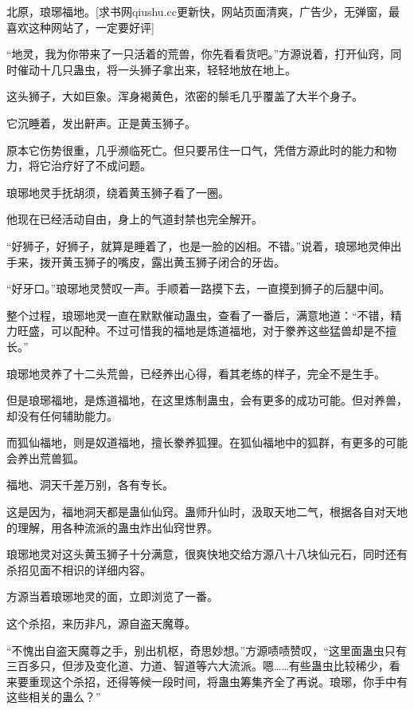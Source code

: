 
\begin{this_body}

北原，琅琊福地。[求书网qiushu.cc更新快，网站页面清爽，广告少，无弹窗，最喜欢这种网站了，一定要好评]

“地灵，我为你带来了一只活着的荒兽，你先看看货吧。”方源说着，打开仙窍，同时催动十几只蛊虫，将一头狮子拿出来，轻轻地放在地上。

这头狮子，大如巨象。浑身褐黄色，浓密的鬃毛几乎覆盖了大半个身子。

它沉睡着，发出鼾声。正是黄玉狮子。

原本它伤势很重，几乎濒临死亡。但只要吊住一口气，凭借方源此时的能力和物力，将它治疗好了不成问题。

琅琊地灵手抚胡须，绕着黄玉狮子看了一圈。

他现在已经活动自由，身上的气道封禁也完全解开。

“好狮子，好狮子，就算是睡着了，也是一脸的凶相。不错。”说着，琅琊地灵伸出手来，拨开黄玉狮子的嘴皮，露出黄玉狮子闭合的牙齿。

“好牙口。”琅琊地灵赞叹一声。手顺着一路摸下去，一直摸到狮子的后腿中间。

整个过程，琅琊地灵一直在默默催动蛊虫，查看了一番后，满意地道：“不错，精力旺盛，可以配种。不过可惜我的福地是炼道福地，对于豢养这些猛兽却是不擅长。”

琅琊地灵养了十二头荒兽，已经养出心得，看其老练的样子，完全不是生手。

但是琅琊福地，是炼道福地，在这里炼制蛊虫，会有更多的成功可能。但对养兽，却没有任何辅助能力。

而狐仙福地，则是奴道福地，擅长豢养狐狸。在狐仙福地中的狐群，有更多的可能会养出荒兽狐。

福地、洞天千差万别，各有专长。

这是因为，福地洞天都是蛊仙仙窍。蛊师升仙时，汲取天地二气，根据各自对天地的理解，用各种流派的蛊虫炸出仙窍世界。

琅琊地灵对这头黄玉狮子十分满意，很爽快地交给方源八十八块仙元石，同时还有杀招见面不相识的详细内容。

方源当着琅琊地灵的面，立即浏览了一番。

这个杀招，来历非凡，源自盗天魔尊。

“不愧出自盗天魔尊之手，别出机枢，奇思妙想。”方源啧啧赞叹，“这里面蛊虫只有三百多只，但涉及变化道、力道、智道等六大流派。嗯……有些蛊虫比较稀少，看来要重现这个杀招，还得等候一段时间，将蛊虫筹集齐全了再说。琅琊，你手中有这些相关的蛊么？”


\end{this_body}
